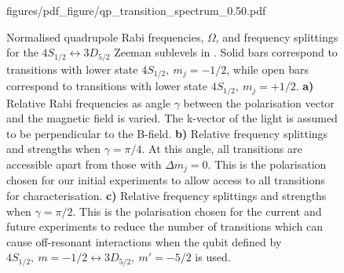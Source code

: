 \begin{figure}
\begin{center}
{            figures/pdf_figure/qp_transition_spectrum_0.50.pdf
            }
        \end{center}
        \vspace*{-0.5cm}
        \caption{
            Normalised quadrupole Rabi frequencies, $\Omega$, and frequency splittings for the $4S_{1/2} \leftrightarrow 3D_{5/2}$ Zeeman sublevels in \ca. Solid bars correspond to transitions with lower state $4S_{1/2},~m_j = -1/2$, while open bars correspond to transitions with lower state $4S_{1/2},~m_j = +1/2$.
            \textbf{a)} Relative Rabi frequencies as angle $\gamma$ between the polarisation vector and the magnetic field is varied. The k-vector of the light is assumed to be perpendicular to the B-field.
            \textbf{b)} Relative frequency splittings and strengths when $\gamma = \pi/4$. At this angle, all transitions are accessible apart from those with $\Delta m_j = 0$. This is the polarisation chosen for our initial experiments to allow access to all transitions for characterisation.
            \textbf{c)} Relative frequency splittings and strengths when $\gamma = \pi/2$. This is the polarisation chosen for the current and future experiments to reduce the number of transitions which can cause off-resonant interactions when the qubit defined by $4S_{1/2},~m = -1/2 \leftrightarrow 3D_{5/2},~m' = -5/2$ is used.
            }
        \label{fig:quadrupole}
    \end{figure}

